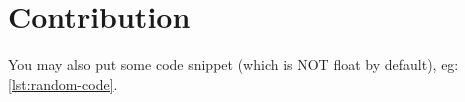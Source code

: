 \documentclass[12pt,a4paper,openright,twoside]{book}
\begin{document}





\chapter{Contribution}

You may also put some code snippet (which is NOT float by default), eg: \cref{lst:random-code}.





\backmatter

\nocite{*} %



\end{document}
